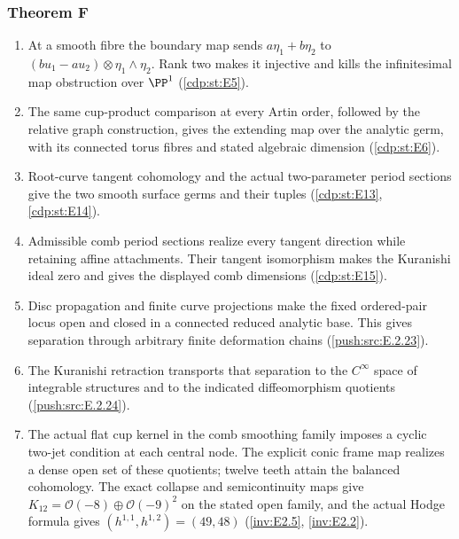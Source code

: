 \subsubsection*{Theorem F}
\begin{enumerate}[label=\arabic*.,leftmargin=*]
\item\hypertarget{step-II-F-1}{} At a smooth fibre the boundary
map sends $a\eta_1+b\eta_2$ to
$(bu_1-au_2)\otimes\eta_1\wedge\eta_2$. Rank two makes it
injective and kills the infinitesimal map obstruction over
$\PP^1$ (\hyperref[cdp:st:E5]{\ref*{cdp:st:E5}}).
\item\hypertarget{step-II-F-2}{} The same cup-product comparison
at every Artin order, followed by the relative graph construction,
gives the extending map over the analytic germ, with its
connected torus fibres and stated algebraic dimension
(\hyperref[cdp:st:E6]{\ref*{cdp:st:E6}}).
\item\hypertarget{step-II-F-3}{} Root-curve tangent cohomology
and the actual two-parameter period sections give the two smooth
surface germs and their tuples
(\hyperref[cdp:st:E13]{\ref*{cdp:st:E13}},
\hyperref[cdp:st:E14]{\ref*{cdp:st:E14}}).
\item\hypertarget{step-II-F-4}{} Admissible comb period sections
realize every tangent direction while retaining affine attachments.
Their tangent isomorphism makes the Kuranishi ideal zero and gives
the displayed comb dimensions
(\hyperref[cdp:st:E15]{\ref*{cdp:st:E15}}).
\item\hypertarget{step-II-F-5}{} Disc propagation and finite
curve projections make the fixed ordered-pair locus open and
closed in a connected reduced analytic base. This gives
separation through arbitrary finite deformation chains
(\hyperref[push:src:E.2.23]{\ref*{push:src:E.2.23}}).
\item\hypertarget{step-II-F-6}{} The Kuranishi retraction transports
that separation to the $C^\infty$ space of integrable structures
and to the indicated diffeomorphism quotients
(\hyperref[push:src:E.2.24]{\ref*{push:src:E.2.24}}).
\item\hypertarget{step-II-F-7}{} The actual flat cup kernel in the comb smoothing family
imposes a cyclic two-jet condition at each central node. The explicit
conic frame map realizes a dense open set of these quotients;
twelve teeth attain the balanced cohomology. The exact collapse
and semicontinuity maps give $K_{12}=\mathcal O(-8)\oplus\mathcal O(-9)^2$
on the stated open family, and the actual Hodge formula gives
$(h^{1,1},h^{1,2})=(49,48)$
(\hyperref[inv:E2.5]{\ref*{inv:E2.5}},
\hyperref[inv:E2.2]{\ref*{inv:E2.2}}).
\end{enumerate}

